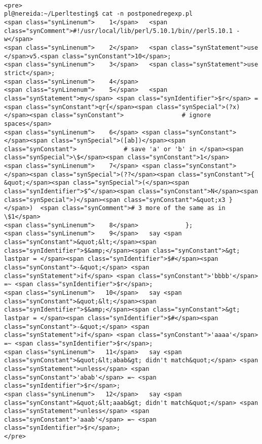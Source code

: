 \begin{verbatim}

<pre>
pl@nereida:~/Lperltesting$ cat -n postponedregexp.pl
<span class="synLinenum">    1</span>   <span class="synComment">#!/usr/local/lib/perl/5.10.1/bin//perl5.10.1 -w</span>
<span class="synLinenum">    2</span>   <span class="synStatement">use </span>v5.<span class="synConstant">10</span>;
<span class="synLinenum">    3</span>   <span class="synStatement">use strict</span>;
<span class="synLinenum">    4</span> 
<span class="synLinenum">    5</span>   <span class="synStatement">my</span> <span class="synIdentifier">$r</span> = <span class="synConstant">qr{</span><span class="synSpecial">(?x)</span><span class="synConstant">                # ignore spaces</span>
<span class="synLinenum">    6</span> <span class="synConstant">              </span><span class="synSpecial">([ab])</span><span class="synConstant">             # save 'a' or 'b' in </span><span class="synSpecial">\$</span><span class="synConstant">1</span>
<span class="synLinenum">    7</span> <span class="synConstant">              </span><span class="synSpecial">(??</span><span class="synConstant">{ &quot;</span><span class="synSpecial">(</span><span class="synIdentifier">$^</span><span class="synConstant">N</span><span class="synSpecial">)</span><span class="synConstant">&quot;x3 }</span>)  <span class="synComment"># 3 more of the same as in \$1</span>
<span class="synLinenum">    8</span>             };
<span class="synLinenum">    9</span>   say <span class="synConstant">&quot;&lt;</span><span class="synIdentifier">$&amp;</span><span class="synConstant">&gt; lastpar = </span><span class="synIdentifier">$#</span><span class="synConstant">-&quot;</span> <span class="synStatement">if</span> <span class="synConstant">'bbbb'</span> =~ <span class="synIdentifier">$r</span>;
<span class="synLinenum">   10</span>   say <span class="synConstant">&quot;&lt;</span><span class="synIdentifier">$&amp;</span><span class="synConstant">&gt; lastpar = </span><span class="synIdentifier">$#</span><span class="synConstant">-&quot;</span> <span class="synStatement">if</span> <span class="synConstant">'aaaa'</span> =~ <span class="synIdentifier">$r</span>;
<span class="synLinenum">   11</span>   say <span class="synConstant">&quot;&lt;abab&gt; didn't match&quot;</span> <span class="synStatement">unless</span> <span class="synConstant">'abab'</span> =~ <span class="synIdentifier">$r</span>;
<span class="synLinenum">   12</span>   say <span class="synConstant">&quot;&lt;aaab&gt; didn't match&quot;</span> <span class="synStatement">unless</span> <span class="synConstant">'aaab'</span> =~ <span class="synIdentifier">$r</span>;
</pre>

\end{verbatim}%

